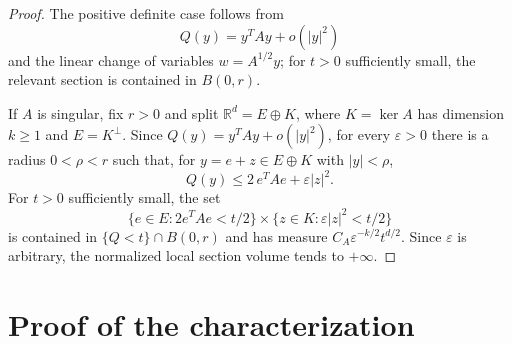 \documentclass[11pt]{amsart}
\def\R{\mathbb{R}}
\begin{document}
\begin{proof}
The positive definite case follows from
\[
    Q(y)=y^TAy+o(|y|^2)
\]
and the linear change of variables $w=A^{1/2}y$; for $t>0$ sufficiently small,
the relevant section is contained in $B(0,r)$.

If $A$ is singular, fix $r>0$ and split $\R^d=E\oplus K$, where
$K=\ker A$ has dimension $k\geq 1$ and $E=K^\perp$.  Since
$Q(y)=y^TAy+o(|y|^2)$, for every $\varepsilon>0$ there is a radius
$0<\rho<r$ such that, for $y=e+z\in E\oplus K$ with $|y|<\rho$,
\[
    Q(y)\leq 2\,e^TAe+\varepsilon |z|^2.
\]
For $t>0$ sufficiently small, the set
\[
    \{e\in E:2e^TAe<t/2\}\times
    \{z\in K:\varepsilon |z|^2<t/2\}
\]
is contained in $\{Q<t\}\cap B(0,r)$ and has measure
$C_A\varepsilon^{-k/2}t^{d/2}$.  Since $\varepsilon$ is arbitrary, the
normalized local section volume tends to $+\infty$.
\end{proof}

\section{Proof of the characterization}
\end{document}
